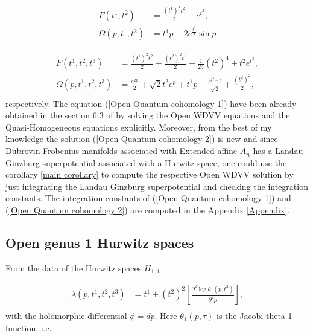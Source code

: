 \documentclass{article}
\theoremstyle{definition}
\begin{document}
\begin{equation}\label{Open Quantum cohomology 1}
\begin{split}
F(t^1,t^2)&=\frac{(t^1)^2t^2}{2}+e^{t^2},\\
\Omega(p,t^1,t^2)&=t^1p-2e^{\frac{t^2}{2}}\sin p
\end{split}
\end{equation}

\begin{equation}\label{Open Quantum cohomology 2}
\begin{split}
F(t^1,t^2,t^3)&=\frac{(t^1)^2t^2}{2}+\frac{(t^2)^2t^1}{2}-\frac{1}{24}(t^2)^4+t^2e^{t^3},\\
\Omega(p,t^1,t^2,t^3)&=\frac{e^{2p}}{2}+\sqrt{2}t^2e^p+t^1p-\frac{e^{t^3-p}}{\sqrt{2}}+\frac{(t^2)^2}{2},\\
\end{split}
\end{equation}
respectively. The equation (\ref{Open Quantum cohomology 1}) have been already obtained in the section  6.3 of \cite{Buryak} by solving the Open WDVV equations and the Quasi-Homogeneous equations explicitly. Moreover, from the best of my knowledge the solution (\ref{Open Quantum cohomology 2}) is new and since Dubrovin Frobenius manifolds associated with Extended affine $A_n$ has a Landau Ginzburg superpotential associated with a Hurwitz space, one could use the corollary \ref{main corollary} to compute the respective Open WDVV solution by just integrating the Landau Ginzburg superpotential  and checking the integration constants. The integration constants of (\ref{Open Quantum cohomology 1}) and (\ref{Open Quantum cohomology 2})  are computed in the Appendix \ref{Appendix}. 
\\


\subsection{Open genus 1 Hurwitz spaces}
From the data of the Hurwitz spaces $H_{1,1}$   

\begin{equation*}
\begin{split}
\lambda(p,t^1,t^2,t^3)&=t^1+(t^2)^2\left[\frac{\partial ^2\log\theta_1(p,t^3)}{\partial ^2p}\right],\\
\end{split}
\end{equation*}
with the holomorphic differential $\phi=dp$. Here $\theta_1(p,\tau)$ is the Jacobi theta 1 function. i.e.
\end{document}
